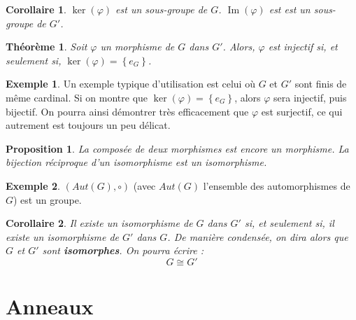 \documentclass[french]{book}
\theoremstyle{plain}
\newtheorem{thm}{Théorème}[chapter]
\newtheorem{prop}{Proposition}[chapter]
\newtheorem{cor}{Corollaire}[chapter]
\theoremstyle{definition}
\newtheorem{exa}{Exemple}[chapter]
\theoremstyle{remark}
\DeclareMathOperator{\im}{Im}
\begin{document}
\begin{cor}
	$\ker(\varphi)$ est un sous-groupe de $G$. $\im(\varphi)$ est est un sous-groupe de $G'$.
\end{cor}
\begin{thm}
	Soit $\varphi$ un morphisme de $G$ dans $G'$. Alors, $\varphi$ est injectif si, et seulement si, $\ker(\varphi)=\left\{e_G\right\}$.
\end{thm}
\begin{exa}
	Un exemple typique d'utilisation est celui où $G$ et $G'$ sont finis de même cardinal. Si on montre que $\ker(\varphi)=\left\{e_G\right\}$, alors $\varphi$ sera injectif, puis bijectif. On pourra ainsi démontrer très efficacement que $\varphi$ est surjectif, ce qui autrement est toujours un peu délicat.
\end{exa}
\begin{prop}
	La composée de deux morphismes est encore un morphisme. La bijection réciproque d'un isomorphisme est un isomorphisme.
\end{prop}
\begin{exa}
	$(Aut(G),\circ)$ (avec $Aut(G)$ l'ensemble des automorphismes de $G$) est un groupe.
\end{exa}
\begin{cor}
	Il existe un isomorphisme de $G$ dans $G'$ si, et seulement si, il existe un isomorphisme de $G'$ dans $G$. De manière condensée, on dira alors que $G$ et $G'$ sont \textbf{isomorphes}. On pourra écrire : $$G\cong G'$$
\end{cor}
\section{Anneaux}
\end{document}
